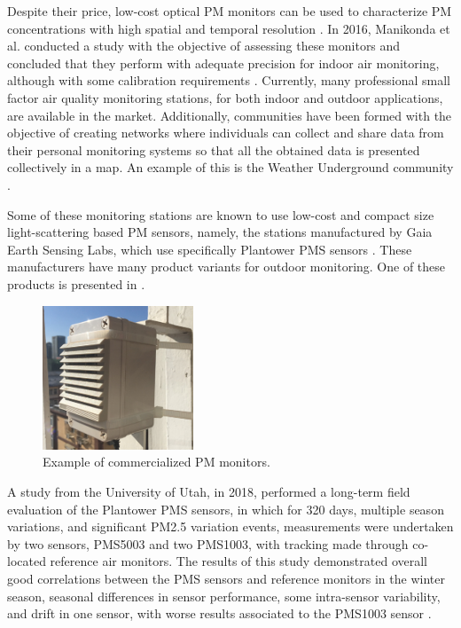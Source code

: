 Despite their price, low-cost optical PM monitors can be used to characterize PM concentrations with high spatial and temporal resolution \cite{Manikonda2016}. In 2016, Manikonda et al. conducted a study with the objective of assessing these monitors and concluded that they perform with adequate precision for indoor air monitoring, although with some calibration requirements \cite{Manikonda2016}. Currently, many professional small factor air quality monitoring stations, for both indoor and outdoor applications, are available in the market. Additionally, communities have been formed with the objective of creating networks where individuals can collect and share data from their personal monitoring systems so that all the obtained data is presented collectively in a map. An example of this is the Weather Underground community \cite{WeatherUnderg2019}.

Some of these monitoring stations are known to use low-cost and compact size light-scattering based PM sensors, namely, the stations manufactured by Gaia Earth Sensing Labs, which use specifically Plantower PMS sensors \cite{AQICN}. These manufacturers have many product variants for outdoor monitoring. One of these products is presented in .

\begin{figure}[ht]
\centering
\includegraphics[width=0.4\textwidth]{./Images/ieec3.png}
\caption{Example of commercialized PM monitors.}
\label{fig:ieec3}
\end{figure}

A study from the University of Utah, in 2018, performed a long-term field evaluation of the Plantower PMS sensors, in which for 320 days, multiple season variations, and significant PM2.5 variation events, measurements were undertaken by two sensors, PMS5003 and two PMS1003, with tracking made through co-located reference air monitors. The results of this study demonstrated overall good correlations between the PMS sensors and reference monitors in the winter season, seasonal differences in sensor performance, some intra-sensor variability, and drift in one sensor, with worse results associated to the PMS1003 sensor \cite{Sayahi2018}.


